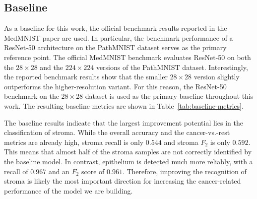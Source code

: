 \subsection{Baseline}
As a baseline for this work, the official benchmark results reported in the
MedMNIST paper are used. In particular, the benchmark performance of a
ResNet-50 architecture on the PathMNIST dataset serves as the primary reference
point. The official MedMNIST benchmark evaluates ResNet-50 on both the
$28 \times 28$ and the $224 \times 224$ versions of the PathMNIST dataset.
Interestingly, the reported benchmark results show that the smaller
$28 \times 28$ version slightly outperforms the higher-resolution variant. For
this reason, the ResNet-50 benchmark on the $28 \times 28$ dataset is used as
the primary baseline throughout this work. The resulting baseline metrics are
shown in Table~\ref{tab:baseline-metrics}. 

The baseline results indicate that the largest improvement potential lies in the
classification of stroma. While the overall accuracy and the cancer-vs.-rest
metrics are already high, stroma recall is only $0.544$ and stroma $F_2$ is only
$0.592$. This means that almost half of the stroma samples are not correctly
identified by the baseline model. In contrast, epithelium is detected much more
reliably, with a recall of $0.967$ and an $F_2$ score of $0.961$. Therefore,
improving the recognition of stroma is likely the most important direction for
increasing the cancer-related performance of the model we are building.
